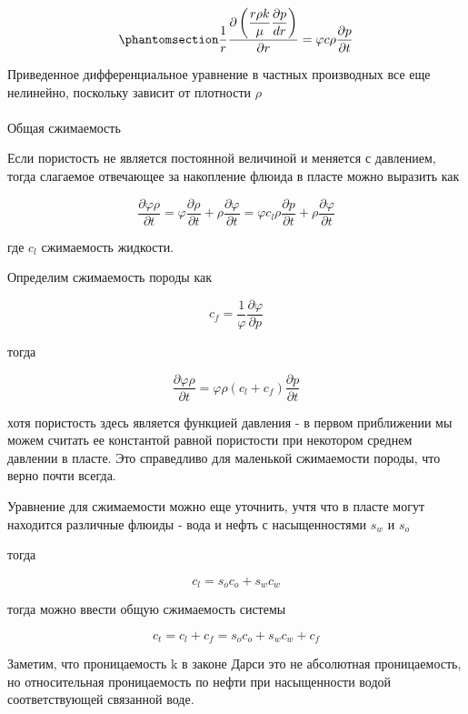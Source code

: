 \documentclass[
  russian,
  letterpaper,
  DIV=11,
  numbers=noendperiod,
  oneside]{scrartcl}
\makeatletter
\let\oldparagraph\paragraph
\renewcommand{\paragraph}{
    \@ifstar
      \xxxParagraphStar
      \xxxParagraphNoStar
  }
\newcommand{\xxxParagraphStar}[1]{\oldparagraph*{#1}\mbox{}}
\newcommand{\xxxParagraphNoStar}[1]{\oldparagraph{#1}\mbox{}}
\makeatother
\begin{document}
\begin{equation}\phantomsection\label{eq-diff_eq_rad_2}{ 
\frac{1}{r}\frac{\partial\left( \dfrac{r\rho k}{\mu}\dfrac{\partial p}{dr}\right)}{\partial r}=\varphi c \rho \frac{\partial p}{\partial t}  
}\end{equation}

Приведенное дифференциальное уравнение в частных производных все еще
нелинейно, поскольку зависит от плотности \(\rho\)

\paragraph{Общая
сжимаемость}\label{ux43eux431ux449ux430ux44f-ux441ux436ux438ux43cux430ux435ux43cux43eux441ux442ux44c}

Если пористость не является постоянной величиной и меняется с давлением,
тогда слагаемое отвечающее за накопление флюида в пласте можно выразить
как

\[
\frac{\partial \varphi \rho}{\partial t} = \varphi \frac{\partial \rho}{\partial t}+ \rho \frac{\partial \varphi }{\partial t} = \varphi c_l \rho \frac{\partial p}{\partial t} + \rho \frac{\partial \varphi }{\partial t}  
\]

где \(c_l\) сжимаемость жидкости.

Определим сжимаемость породы как

\[
c_f = \frac{1}{\varphi} \frac{\partial \varphi}{\partial p}
\]

тогда

\[
\frac{\partial \varphi \rho}{\partial t}  = \varphi \rho (c_l + c_f) \frac{\partial p}{\partial t}   
\]

хотя пористость здесь является функцией давления - в первом приближении
мы можем считать ее константой равной пористости при некотором среднем
давлении в пласте. Это справедливо для маленькой сжимаемости породы, что
верно почти всегда.

Уравнение для сжимаемости можно еще уточнить, учтя что в пласте могут
находится различные флюиды - вода и нефть с насыщенностями \(s_w\) и
\(s_o\)

тогда

\[ 
c_l = s_o c_o + s_w c_w 
\]

тогда можно ввести общую сжимаемость системы

\[
 c_t = c_l + c_f = s_o c_o + s_w c_w  + c_f 
\]

Заметим, что проницаемость k в законе Дарси это не абсолютная
проницаемость, но относительная проницаемость по нефти при насыщенности
водой соответствующей связанной воде.
\end{document}
